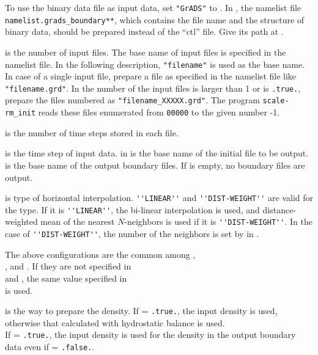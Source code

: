 To use the binary data file as input data, set \verb|"GrADS"| to .
In \scalerm, the namelist file \verb|namelist.grads_boundary**|, which contains the file name and the structure of binary data, should be prepared instead of the ``ctl'' file.
Give its path at .

 is the number of input files.
The base name of input files is specified in the namelist file.
In the following description, \verb|"filename"| is used as the base name.
In case of a single input file, prepare a file as specified in the namelist file like \verb|"filename.grd"|.
In the number of the input files is larger than 1 or  is \verb|.true.|, prepare the files numbered as \verb|"filename_XXXXX.grd"|.
The program \verb|scale-rm_init| reads these files enumerated from \verb|00000| to the given number -1.

 is the number of time steps stored in each file.


 is the time step of input data.
 in  is the base name of the initial file to be output.
 is the base name of the output boundary files.
If  is empty, no boundary files are output.

 is type of horizontal interpolation.
\verb|''LINEAR''| and \verb|''DIST-WEIGHT''| are valid for the type.
If it is \verb|''LINEAR''|, the bi-linear interpolation is used, and distance-weighted mean of the nearest $N$-neighbors is used if it is \verb|''DIST-WEIGHT''|.
In the case of \verb|''DIST-WEIGHT''|, the number of the neighbors is set by  in .

The above configurations are the common among ,\\ , and .
If they are not specified in\\  and , the same value specified in\\  is used.


 is the way to prepare the density.
If  = \verb|.true.|, the input density is used, otherwise that calculated with hydrostatic balance is used.\\
If  = \verb|.true.|, the input density is used for the density in the output boundary data even if  = \verb|.false.|.


